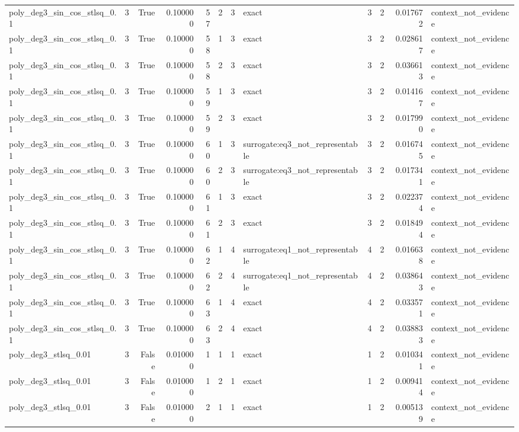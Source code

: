 \begin{tabular}{lrrrrrrlrrrl}
poly\_deg3\_sin\_cos\_stlsq\_0.1 & 3 & True & 0.100000 & 57 & 2 & 3 & exact & 3 & 2 & 0.017672 & context\_not\_evidence \\
poly\_deg3\_sin\_cos\_stlsq\_0.1 & 3 & True & 0.100000 & 58 & 1 & 3 & exact & 3 & 2 & 0.028617 & context\_not\_evidence \\
poly\_deg3\_sin\_cos\_stlsq\_0.1 & 3 & True & 0.100000 & 58 & 2 & 3 & exact & 3 & 2 & 0.036613 & context\_not\_evidence \\
poly\_deg3\_sin\_cos\_stlsq\_0.1 & 3 & True & 0.100000 & 59 & 1 & 3 & exact & 3 & 2 & 0.014167 & context\_not\_evidence \\
poly\_deg3\_sin\_cos\_stlsq\_0.1 & 3 & True & 0.100000 & 59 & 2 & 3 & exact & 3 & 2 & 0.017990 & context\_not\_evidence \\
poly\_deg3\_sin\_cos\_stlsq\_0.1 & 3 & True & 0.100000 & 60 & 1 & 3 & surrogate:eq3\_not\_representable & 3 & 2 & 0.016745 & context\_not\_evidence \\
poly\_deg3\_sin\_cos\_stlsq\_0.1 & 3 & True & 0.100000 & 60 & 2 & 3 & surrogate:eq3\_not\_representable & 3 & 2 & 0.017341 & context\_not\_evidence \\
poly\_deg3\_sin\_cos\_stlsq\_0.1 & 3 & True & 0.100000 & 61 & 1 & 3 & exact & 3 & 2 & 0.022374 & context\_not\_evidence \\
poly\_deg3\_sin\_cos\_stlsq\_0.1 & 3 & True & 0.100000 & 61 & 2 & 3 & exact & 3 & 2 & 0.018494 & context\_not\_evidence \\
poly\_deg3\_sin\_cos\_stlsq\_0.1 & 3 & True & 0.100000 & 62 & 1 & 4 & surrogate:eq1\_not\_representable & 4 & 2 & 0.016638 & context\_not\_evidence \\
poly\_deg3\_sin\_cos\_stlsq\_0.1 & 3 & True & 0.100000 & 62 & 2 & 4 & surrogate:eq1\_not\_representable & 4 & 2 & 0.038643 & context\_not\_evidence \\
poly\_deg3\_sin\_cos\_stlsq\_0.1 & 3 & True & 0.100000 & 63 & 1 & 4 & exact & 4 & 2 & 0.033571 & context\_not\_evidence \\
poly\_deg3\_sin\_cos\_stlsq\_0.1 & 3 & True & 0.100000 & 63 & 2 & 4 & exact & 4 & 2 & 0.038833 & context\_not\_evidence \\
poly\_deg3\_stlsq\_0.01 & 3 & False & 0.010000 & 1 & 1 & 1 & exact & 1 & 2 & 0.010341 & context\_not\_evidence \\
poly\_deg3\_stlsq\_0.01 & 3 & False & 0.010000 & 1 & 2 & 1 & exact & 1 & 2 & 0.009414 & context\_not\_evidence \\
poly\_deg3\_stlsq\_0.01 & 3 & False & 0.010000 & 2 & 1 & 1 & exact & 1 & 2 & 0.005139 & context\_not\_evidence \\

\end{tabular}
